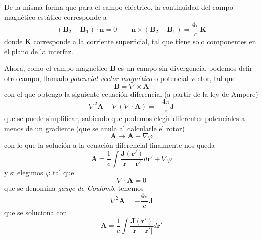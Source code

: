 \documentclass[a4paper]{article}
\numberwithin{equation}{section} %
\renewcommand{\vec}[1]{\boldsymbol{#1}}
\begin{document}
De la misma forma que para el campo eléctrico, la continuidad del campo magnético estático corresponde a 
\begin{equation}
	(\vec{B}_2 - \vec{B}_1)\cdot \vec{n} = 0 \qquad  \vec{n} \times (\vec{B}_2 - \vec{B}_1) = \frac{4\pi}{c} \vec{K}  
\end{equation}
donde $\vec{K}$ corresponde a la corriente superficial, tal que tiene solo componentes en el plano de la interfaz.

Ahora, como el campo magnético $\vec{B}$ es un campo sin divergencia, podemos defir otro campo, llamado \emph{potencial vector magnético} o potencial vector, tal que
\begin{equation}
\vec{B} = \nabla \times \vec{A}
\end{equation}
con el que obtengo la siguiente ecuación diferencial (a partir de la ley de Ampere)
\begin{equation}
\nabla^2 \vec{A} - \nabla (\nabla \cdot \vec{A}) = - \frac{4\pi}{c} \vec{J}
\end{equation}
que se puede simplificar, sabiendo que podemos elegir diferentes potenciales a menos de un gradiente (que se anula al calcularle el rotor)
\begin{equation}
\vec{A} \to \vec{A} + \nabla \varphi
\label{eq:gauge_A}
\end{equation}
con lo que la solución a la ecuación diferencial finalmente nos queda
\begin{equation}
\vec{A} = \frac{1}{c} \int  \frac{\vec{J}(\vec{r}')}{|\vec{r} - \vec{r}'|} d\vec{r}' + \nabla \varphi
\end{equation}
y si elegimos $\varphi$ tal que
\begin{equation}
\nabla \cdot \vec{A} = 0
\label{eq:gauge_coulumb}
\end{equation}
que se denomina \emph{gauge de Coulomb}, tenemos
\begin{equation}
\nabla^2 \vec{A} = - \frac{4\pi}{c} \vec{J}
\end{equation}
que se soluciona con
\begin{equation}
\vec{A} = \frac{1}{c} \int  \frac{\vec{J}(\vec{r}')}{|\vec{r} - \vec{r}'|} d\vec{r}'
\end{equation}
\end{document}
